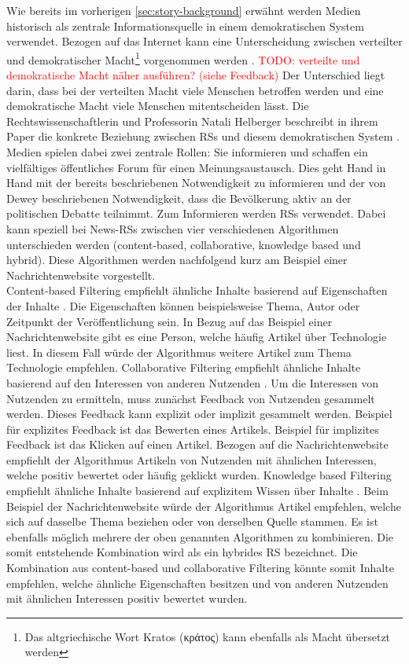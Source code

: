 Wie bereits im vorherigen \autoref{sec:story-background} erwähnt werden Medien historisch als zentrale Informationsquelle in einem demokratischen System verwendet.
Bezogen auf das Internet kann eine Unterscheidung zwischen verteilter und demokratischer Macht\footnote{Das altgriechische Wort Kratos (\textgreek{κράτος}) kann ebenfalls als Macht übersetzt werden} vorgenommen werden \cite{free-speech-algorithmic}.
\textcolor{red}{TODO: verteilte und demokratische Macht näher ausführen? (siehe Feedback)}
Der Unterschied liegt darin, dass bei der verteilten Macht viele Menschen betroffen werden und eine demokratische Macht viele Menschen mitentscheiden lässt.
Die Rechtswissenschaftlerin und Professorin Natali Helberger beschreibt in ihrem Paper die konkrete Beziehung zwischen \acp{RS} und diesem demokratischen System \cite{democratic-role}.
Medien spielen dabei zwei zentrale Rollen: Sie informieren und schaffen ein vielfältiges öffentliches Forum für einen Meinungsaustausch.
Dies geht Hand in Hand mit der bereits beschriebenen Notwendigkeit zu informieren und der von Dewey beschriebenen Notwendigkeit, dass die Bevölkerung aktiv an der politischen Debatte teilnimmt.
Zum Informieren werden \acp{RS} verwendet.
Dabei kann speziell bei News-\acp{RS} zwischen vier verschiedenen Algorithmen unterschieden werden (content-based, collaborative, knowledge based und hybrid).
Diese Algorithmen werden nachfolgend kurz am Beispiel einer Nachrichtenwebsite vorgestellt. \\

Content-based Filtering empfiehlt ähnliche Inhalte basierend auf Eigenschaften der Inhalte \cite{content-based-rs}.
Die Eigenschaften können beispielsweise Thema, Autor oder Zeitpunkt der Veröffentlichung sein.
In Bezug auf das Beispiel einer Nachrichtenwebsite gibt es eine Person, welche häufig Artikel über Technologie liest.
In diesem Fall würde der Algorithmus weitere Artikel zum Thema Technologie empfehlen.
Collaborative Filtering empfiehlt ähnliche Inhalte basierend auf den Interessen von anderen Nutzenden \cite{collaborative-filtering-rs}.
Um die Interessen von Nutzenden zu ermitteln, muss zunächst Feedback von Nutzenden gesammelt werden.
Dieses Feedback kann explizit oder implizit gesammelt werden.
Beispiel für explizites Feedback ist das Bewerten eines Artikels.
Beispiel für implizites Feedback ist das Klicken auf einen Artikel.
Bezogen auf die Nachrichtenwebsite empfiehlt der Algorithmus Artikeln von Nutzenden mit ähnlichen Interessen, welche positiv bewertet oder häufig geklickt wurden.
Knowledge based Filtering empfiehlt ähnliche Inhalte basierend auf explizitem Wissen über Inhalte \cite{knowledge-based-rs}.
Beim Beispiel der Nachrichtenwebsite würde der Algorithmus Artikel empfehlen, welche sich auf dasselbe Thema beziehen oder von derselben Quelle stammen.
Es ist ebenfalls möglich mehrere der oben genannten Algorithmen zu kombinieren.
Die somit entstehende Kombination wird als ein hybrides \ac{RS} bezeichnet.
Die Kombination aus content-based und collaborative Filtering könnte somit Inhalte empfehlen, welche ähnliche Eigenschaften besitzen und von anderen Nutzenden mit ähnlichen Interessen positiv bewertet wurden.\\

